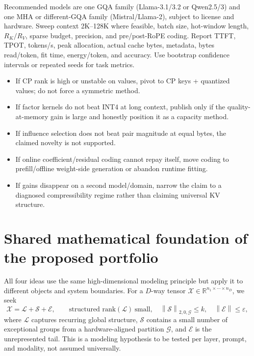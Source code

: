 \documentclass[10pt]{article}
\newcommand{\R}{\mathbb{R}}
\newcommand{\norm}[1]{\left\lVert #1\right\rVert}
\begin{document}
Recommended models are one GQA family (Llama-3.1/3.2 or Qwen2.5/3) and one MHA or different-GQA
family (Mistral/Llama-2), subject to license and hardware. Sweep context 2K--128K where feasible,
batch size, hot-window length, $R_K/R_V$, sparse budget, precision, and pre/post-RoPE coding.
Report TTFT, TPOT, tokens/s, peak allocation, actual cache bytes, metadata, bytes read/token,
fit time, energy/token, and accuracy. Use bootstrap confidence intervals or repeated seeds for
task metrics.

\begin{riskbox}[title={Fatal-flaw gates}]
\begin{itemize}[leftmargin=1.45em,itemsep=2pt,topsep=2pt]
\item If CP rank is high or unstable on values, pivot to CP keys + quantized values; do not force a
symmetric method.
\item If factor kernels do not beat INT4 at long context, publish only if the quality-at-memory
gain is large and honestly position it as a capacity method.
\item If influence selection does not beat pair magnitude at equal bytes, the claimed novelty is
not supported.
\item If online coefficient/residual coding cannot repay itself, move coding to prefill/offline
weight-side generation or abandon runtime fitting.
\item If gains disappear on a second model/domain, narrow the claim to a diagnosed compressibility
regime rather than claiming universal KV structure.
\end{itemize}
\end{riskbox}

\section{Shared mathematical foundation of the proposed portfolio}

All four ideas use the same high-dimensional modeling principle but apply it to different
objects and system boundaries. For a $D$-way tensor
$\mathcal X\in\R^{n_1\times\cdots\times n_D}$, we seek
\[
\mathcal X=\mathcal L+\mathcal S+\mathcal E,
\qquad
\text{structured rank}(\mathcal L)\ \text{small},\quad
\norm{\mathcal S}_{2,0,\mathcal G}\le k,\quad
\norm{\mathcal E}\le\varepsilon ,
\]
where $\mathcal L$ captures recurring global structure, $\mathcal S$ contains a small number
of exceptional groups from a hardware-aligned partition $\mathcal G$, and $\mathcal E$ is the
unrepresented tail. This is a modeling hypothesis to be tested per layer, prompt, and modality,
not assumed universally.
\end{document}
